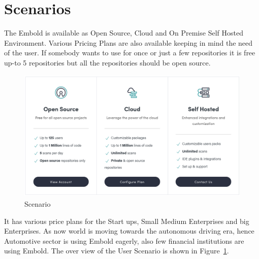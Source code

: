 \section{Scenarios}
The Embold is available as Open Source, Cloud and On Premise Self Hosted Environment. Various Pricing Plans are also available keeping in mind the need of the user. If somebody wants to use for once or just a few repositories it is free up-to 5 repositories but  all the repositories should be open source. \par
\begin{figure}[htbp]
\begin{center}
\includegraphics[width=6.5in, height=2.5in]{scenario.png}
\caption{Scenario}
\label{fig:Scenario}
\end{center}
\end{figure}
\indent It has various price plans for the Start ups, Small Medium Enterprises and big Enterprises. As now world is moving towards the autonomous driving era, hence Automotive sector is using Embold eagerly, also few financial institutions are using Embold. The over view of the User Scenario is shown in Figure~\ref{fig:Scenario}.
